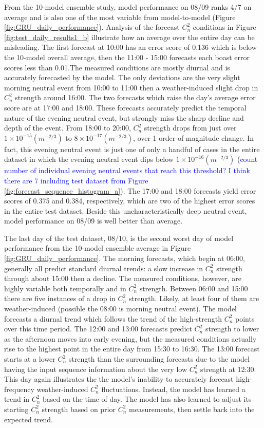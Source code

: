 From the 10-model ensemble study, model performance on 08/09 ranks 4/7 on average and is also one of the most variable from model-to-model (Figure \ref{fig:GRU_daily_performance}). Analysis of the forecast $C_{n}^{2}$ conditions in Figure \ref{fig:test_daily_results1_b} illustrate how an average over the entire day can be misleading. The first forecast at 10:00 has an error score of 0.136 which is below the 10-model overall average, then the 11:00 - 15:00 forecasts each boast error scores less than 0.01.The measured conditions are mostly diurnal and is accurately forecasted by the model. The only deviations are the very slight morning neutral event from 10:00 to 11:00 then a weather-induced slight drop in $C_{n}^{2}$ strength around 16:00. The two forecasts which raise the day's average error score are at 17:00 and 18:00. These forecasts accurately predict the temporal nature of the evening neutral event, but strongly miss the sharp decline and depth of the event. From 18:00 to 20:00, $C_{n}^{2}$ strength drops from just over $1 \times 10^{-15} (m^{-2/3})$ to $8 \times 10^{-17} (m^{-2/3})$, over 1 order-of-magnitude change. In fact, this evening neutral event is just one of only a handful of cases in the entire dataset in which the evening neutral event dips below $1 \times 10^{-16} (m^{-2/3})$ (\textcolor{blue}{count number of individual evening neutral events that reach this threshold? I think there are 7 including test dataset from Figure \ref{fig:forecast_sequence_histogram_a}}). The 17:00 and 18:00 forecasts yield error scores of 0.375 and 0.384, respectively, which are two of the highest error scores in the entire test dataset. Beside this uncharacteristically deep neutral event, model performance on 08/09 is well better than average.

The last day of the test dataset, 08/10, is the second worst day of model performance from the 10-model ensemble average in Figure \ref{fig:GRU_daily_performance}. The morning forecasts, which begin at 06:00, generally all predict standard diurnal trends: a slow increase in $C_{n}^{2}$ strength through about 15:00 then a decline. The measured conditions, however, are highly variable both temporally and in $C_{n}^{2}$ strength. Between 06:00 and 15:00 there are five instances of a drop in $C_{n}^{2}$ strength. Likely, at least four of them are weather-induced (possible the 08:00 is morning neutral event). The model forecasts a diurnal trend which follows the trend of the high-strength $C_{n}^{2}$ points over this time period. The 12:00 and 13:00 forecasts predict $C_{n}^{2}$ strength to lower as the afternoon moves into early evening, but the measured conditions actually rise to the highest point in the entire day from 15:30 to 16:30. The 13:00 forecast starts at a lower $C_{n}^{2}$ strength than the surrounding forecasts due to the model having the input sequence information about the very low $C_{n}^{2}$ strength at 12:30. This day again illustrates the the model's inability to accurately forecast high-frequency weather-induced $C_{n}^{2}$ fluctuations. Instead, the model has learned a trend in $C_{n}^{2}$ based on the time of day. The model has also learned to adjust its starting $C_{n}^{2}$ strength based on prior $C_{n}^{2}$ measurements, then settle back into the expected trend. 

